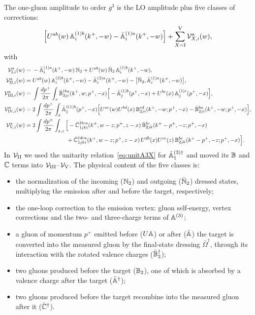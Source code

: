 The one-gluon amplitude to order $g^3$ is the LO amplitude plus five classes of corrections:
\begin{equation}
\Big[U^{ab}(w)\,\mathbb{A}^{(1)b}_i(k^+,-w)-\bar{\mathbb{A}}^{(1)a}_i(k^+,-w)\Big]+\sum_{X={\rm I}}^{\rm V}\mathcal V^a_{X,i}(w),
\label{eq:amp1NLO}
\end{equation}
with
\begin{align}
\mathcal V^a_{{\rm I},i}(w)={}&-\bar{\mathbb{A}}^{(1)a}_i(k^+,-w)\,\mathbb{N}_2+U^{ab}(w)\,\bar{\mathbb{N}}_2\,\mathbb{A}^{(1)b}_i(k^+,-w),\label{eq:VI}\\
\mathcal V^a_{{\rm II},i}(w)={}&U^{ab}(w)\,\mathbb{A}^{(3)b}_i(k^+,-w)-\bar{\mathbb{A}}^{(3)a}_i(k^+,-w)-\big[\bar{\mathbb{N}}_2,\bar{\mathbb{A}}^{(1)a}_i(k^+,-w)\big],\label{eq:VII}\\
\mathcal V^a_{{\rm III},i}(w)={}&\int\frac{dp^+}{2\pi}\int_x\bar{\mathbb{B}}^{\dagger ba}_{3ji}(k^+,w;p^+,-x)\Big[-\bar{\mathbb{A}}^{(1)b}_j(p^+,-x)+U^{bc}(x)\,\mathbb{A}^{(1)c}_j(p^+,-x)\Big],\label{eq:VIII}\\
\mathcal V^a_{{\rm IV},i}(w)={}&2\int\frac{dp^+}{2\pi}\int_x\bar{\mathbb{A}}^{\dagger(1)b}_j(p^+,-x)\Big[U^{ac}(w)U^{bd}(x)\,\mathbb{B}^{cd}_{2ji}(k^+,-w;p^+,-x)-\bar{\mathbb{B}}^{ba}_{2ji}(k^+,-w;p^+,-x)\Big],\label{eq:VIV}\\
\mathcal V^a_{{\rm V},i}(w)={}&2\int\frac{dp^+}{2\pi}\int_{x,z}\Big[-\bar{\mathbb{C}}^{\dagger bca}_{1jki}(k^+,w-z;p^+,z-x)\,\bar{\mathbb{B}}^{bc}_{2jk}(k^+-p^+,-z;p^+,-x)\notag\\
&\hspace{6em}+\bar{\mathbb{C}}^{\dagger dca}_{1jki}(k^+,w-z;p^+,z-x)\,U^{db}(x)U^{ce}(z)\,\mathbb{B}^{be}_{2jk}(k^+-p^+,-z;p^+,-x)\Big].\label{eq:VV}
\end{align}
In $\mathcal V_{\rm II}$ we used the unitarity relation~\eqref{eq:unitA3X} for $\bar{\mathbb{A}}^{(3)\dagger}_1$ and moved its $\mathbb{B}$ and $\mathbb{C}$ terms into $\mathcal V_{\rm III}$--$\mathcal V_{\rm V}$. The physical content of the five classes is:
\begin{itemize}
\item[I:] the normalization of the incoming ($\mathbb{N}_2$) and outgoing ($\bar{\mathbb{N}}_2$) dressed states, multiplying the emission after and before the target, respectively;
\item[II:] the one-loop correction to the emission vertex: gluon self-energy, vertex corrections and the two- and three-charge terms of $\mathbb{A}^{(3)}$;
\item[III:] a gluon of momentum $p^+$ emitted before ($U\mathbb{A}$) or after ($\bar{\mathbb{A}}$) the target is converted into the measured gluon by the final-state dressing $\bar\Omega^\dagger$, through its interaction with the rotated valence charges ($\bar{\mathbb{B}}_3^\dagger$);
\item[IV:] two gluons produced before the target ($\mathbb{B}_2$), one of which is absorbed by a valence charge after the target ($\bar{\mathbb{A}}^\dagger$);
\item[V:] two gluons produced before the target recombine into the measured gluon after it ($\bar{\mathbb{C}}^\dagger$).
\end{itemize}
